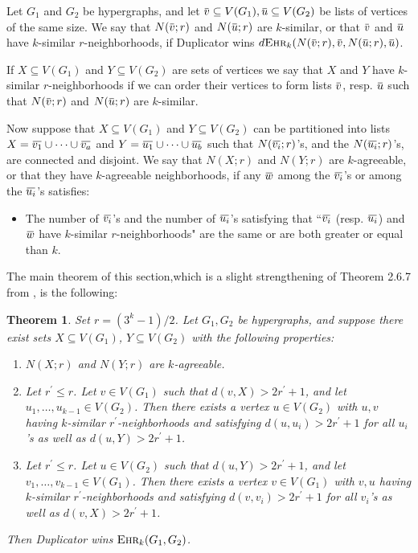 \documentclass[12pt,notitlepage,a4paper]{article}
\newtheorem{theorem}{Theorem}[section]
\theoremstyle{definition}
\newcommand{\overbar}[1]{\mkern 1.5mu\overline{\mkern-1.5mu#1\mkern-1.5mu}\mkern 1.5mu}
\newcommand{\ehr}{\textsc{Ehr}}
\begin{document}
Let $G_1$ and $G_2$ be hypergraphs, and let $\overbar{v} \subseteq V(G_1), 
\overbar{u} \subseteq V(G_2)$ be lists of vertices of the same size.
We say that $N(\overbar{v};r)$ and $N(\overbar{u};r)$ are
$k$-similar, or that $\overbar{v}$ and $\overbar{u}$
have $k$-similar $r$-neighborhoods, if Duplicator wins
$d\ehr_k(N(\overbar{v};r),\overbar{v},N(\overbar{u};r),\overbar{u})$.\par
If $X\subseteq V(G_1)$ and $Y\subseteq V(G_2)$
are sets of vertices we say that $X$ and $Y$ have $k$-similar
$r$-neighborhoods if we can order their vertices to form
lists $\overbar{v}$, resp. $\overbar{u}$ such that $N(\overbar{v};r)$ and
$N(\overbar{u};r)$ are $k$-similar.
\par
Now suppose that $X\subseteq V(G_1)$ and $Y\subseteq V(G_2)$ can
be partitioned into lists $X=\overbar{v_1}\cup \dots \cup \overbar{v_a}$
and $Y=\overbar{u_1}\cup \dots \cup \overbar{u_b}$ 
such that $N(\overbar{v_i};r)$'s, and the
$N(\overbar{u_i};r)$'s, are connected and disjoint. 
We say that $N(X;r)$ and
$N(Y;r)$ are $k$-agreeable,
or that they have $k$-agreeable neighborhoods, 
if any $\overbar{w}$ among the $\overbar{v_i}$'s or
among the $\overbar{u_i}$'s satisfies:
\begin{itemize}
	\item The number of $\overbar{v_i}$'s and 
	the number of $\overbar{u_i}$'s satisfying that ``$\overbar{v_i}$ 
	(resp. $\overbar{u_i}$) and $\overbar{w}$ have $k$-similar 
	$r$-neighborhoods" are the
	same or are both greater or equal than $k$.
\end{itemize}

The main theorem of this section,which
is a slight strengthening of Theorem 
2.6.7 from \cite{spencer2013strange}, is the following:

\begin{theorem}\label{ThmDuplicator}
	Set $r=(3^k-1)/2$.
	Let $G_1,G_2$ be hypergraphs, and suppose there exist
	sets $X\subseteq V(G_1)$, $Y\subseteq V(G_2)$ with the 
	following properties:
	\begin{enumerate}
		\item[(1)] $N(X;r)$ and $N(Y;r)$ are $k$-agreeable.
		\item[(2)] Let $r^\prime\leq r$. Let $v\in V(G_1)$ 
		such that $d(v,X)>2r^\prime+1$, and let
		$u_1,\dots,u_{k-1}\in V(G_2)$. Then there exists a vertex
		$u\in V(G_2)$ with $u,v$ having $k$-similar $r^\prime$-neighborhoods 
		and satisfying $d(u,u_i)>2r^\prime+1$ for all $u_i$'s as well as
		$d(u,Y)>2r^\prime +1$.
		\item[(3)] Let $r^\prime\leq r$. Let $u\in V(G_2)$ 
		such that $d(u,Y)>2r^\prime+1$, and let
		$v_1,\dots,v_{k-1}\in V(G_1)$. Then there exists a vertex
		$v\in V(G_1)$ with $v,u$ having $k$-similar $r^\prime$-neighborhoods 
		and satisfying $d(v,v_i)>2r^\prime+1$ for all $v_i$'s as well as
		$d(v,X)>2r^\prime +1$.
	\end{enumerate}
	Then Duplicator wins $\ehr_k(G_1,G_2)$.
\end{theorem}
\end{document}
